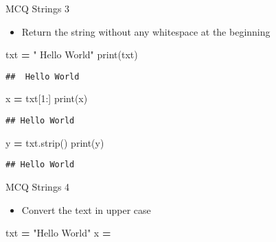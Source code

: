 \documentclass[
  8pt,
  ignorenonframetext,
]{beamer}
\newenvironment{Shaded}{\begin{snugshade}}{\end{snugshade}}
\newcommand{\BuiltInTok}[1]{#1}
\newcommand{\DecValTok}[1]{\textcolor[rgb]{0.00,0.00,0.81}{#1}}
\newcommand{\NormalTok}[1]{#1}
\newcommand{\OperatorTok}[1]{\textcolor[rgb]{0.81,0.36,0.00}{\textbf{#1}}}
\newcommand{\StringTok}[1]{\textcolor[rgb]{0.31,0.60,0.02}{#1}}
\providecommand{\tightlist}{%
  \setlength{\itemsep}{0pt}\setlength{\parskip}{0pt}}
\begin{document}
\begin{frame}[fragile]{MCQ Strings 3}
\protect\hypertarget{mcq-strings-3-1}{}
\begin{itemize}
\tightlist
\item
  Return the string without any whitespace at the beginning
\end{itemize}

\begin{Shaded}
\begin{Highlighting}[]
\NormalTok{txt }\OperatorTok{=} \StringTok{" Hello World"}
\BuiltInTok{print}\NormalTok{(txt)}
\end{Highlighting}
\end{Shaded}

\begin{verbatim}
##  Hello World
\end{verbatim}

\begin{Shaded}
\begin{Highlighting}[]
\NormalTok{x }\OperatorTok{=}\NormalTok{ txt[}\DecValTok{1}\NormalTok{:]}
\BuiltInTok{print}\NormalTok{(x)}
\end{Highlighting}
\end{Shaded}

\begin{verbatim}
## Hello World
\end{verbatim}

\begin{Shaded}
\begin{Highlighting}[]
\NormalTok{y }\OperatorTok{=}\NormalTok{ txt.strip()}
\BuiltInTok{print}\NormalTok{(y)}
\end{Highlighting}
\end{Shaded}

\begin{verbatim}
## Hello World
\end{verbatim}
\end{frame}

\begin{frame}[fragile]{MCQ Strings 4}
\protect\hypertarget{mcq-strings-4}{}
\begin{itemize}
\tightlist
\item
  Convert the text in upper case
\end{itemize}

\begin{Shaded}
\begin{Highlighting}[]
\NormalTok{txt }\OperatorTok{=} \StringTok{"Hello World"}
\NormalTok{x }\OperatorTok{=} 
\end{Highlighting}
\end{Shaded}
\end{frame}
\end{document}
